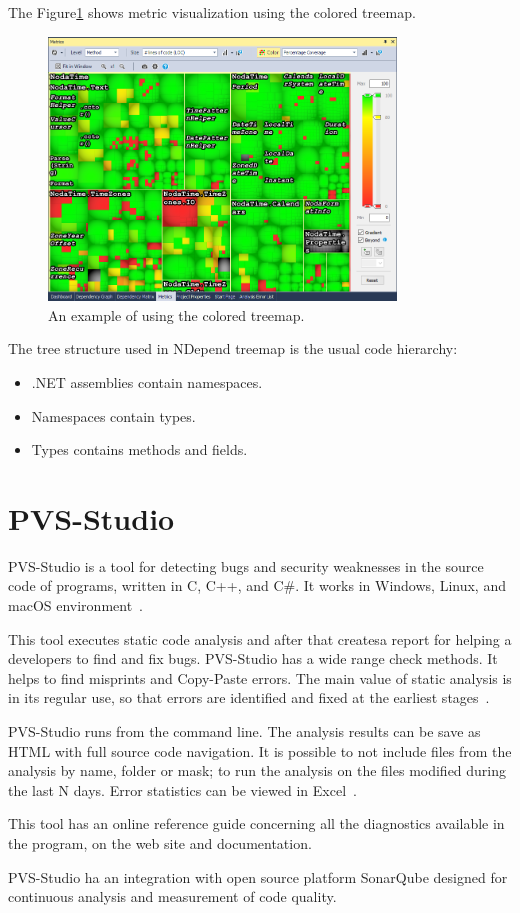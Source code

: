 The Figure\ref{fig:tree} shows metric visualization using the colored treemap.

\begin{figure}[h]
	\centering
	\includegraphics[height=70mm]{figures/tree.png}
	\caption{An example of using the colored treemap.}
	\label{fig:tree}
\end{figure}

The tree structure used in NDepend treemap is the usual code hierarchy: 

\begin{itemize}
	\item .NET assemblies contain namespaces.
	\item Namespaces contain types.
	\item Types contains methods and fields.
\end{itemize}

\section{PVS-Studio}

PVS-Studio is a tool for detecting bugs and security weaknesses in the source code of programs, written in C, C++, and C\#. It works in Windows, Linux, and macOS environment~\cite{pvs}.

This tool executes static code analysis and after that createsa report for helping a developers to find and fix bugs. PVS-Studio has a wide range check methods. It helps to find misprints and Copy-Paste errors.
The main value of static analysis is in its regular use, so that errors are identified and fixed at the earliest stages~\cite{pvs}. 

PVS-Studio runs from the command line. The analysis results can be save as HTML with full source code navigation. It is possible to not include files from the analysis by name, folder or mask; to run the analysis on the files modified during the last N days. Error statistics can be viewed in Excel~\cite{pvs}. 

This tool has an online reference guide concerning all the diagnostics available in the program, on the web site and documentation. 

PVS-Studio ha an integration with open source platform SonarQube designed for continuous analysis and measurement of code quality.